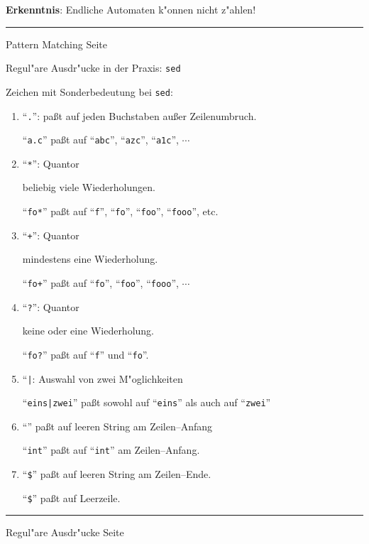 \begin{slide}{}
\textbf{Erkenntnis}: Endliche Automaten k"onnen nicht z"ahlen!



\vspace*{\fill}
\tiny \addtocounter{mypage}{1}
\rule{17cm}{1mm}
Pattern Matching \hspace*{\fill} Seite 
\end{slide}


\begin{slide}{}
\normalsize
\begin{center}
Regul"are Ausdr"ucke in der Praxis: \texttt{sed}
\end{center}

\footnotesize
Zeichen mit Sonderbedeutung bei \texttt{sed}:
\begin{enumerate}
\item ``\texttt{.}'': pa{\ss}t auf jeden Buchstaben au{\ss}er Zeilenumbruch.


      ``\texttt{a.c}'' pa{\ss}t auf 
      ``\texttt{abc}'', ``\texttt{azc}'', ``\texttt{a1c}'', $\cdots$
\item ``\texttt{*}'': Quantor

      beliebig viele Wiederholungen. 
      
      ``\texttt{fo*}'' pa{\ss}t auf 
      ``\texttt{f}'', 
      ``\texttt{fo}'', 
      ``\texttt{foo}'', 
      ``\texttt{fooo}'', etc.
\item ``\texttt{+}'': Quantor

      mindestens eine Wiederholung. 

      ``\texttt{fo+}'' pa{\ss}t auf 
      ``\texttt{fo}'', 
      ``\texttt{foo}'', 
      ``\texttt{fooo}'', $\cdots$
\item ``\texttt{?}'': Quantor

      keine oder eine Wiederholung. 

      ``\texttt{fo?}'' pa{\ss}t auf ``\texttt{f}'' und ``\texttt{fo}''.
\item ``\texttt{|}: Auswahl von zwei M"oglichkeiten


     ``\texttt{eins|zwei}'' pa{\ss}t sowohl auf ``\texttt{eins}'' als auch auf
     ``\texttt{zwei}''
\item ``\texttt{}'' pa{\ss}t auf leeren String am Zeilen--Anfang

     ``\texttt{int}'' pa{\ss}t auf ``\texttt{int}'' am Zeilen--Anfang.
\item ``\texttt{\$}'' %
     pa{\ss}t auf leeren String am Zeilen--Ende.

     ``\texttt{\$}'' %
     pa{\ss}t auf Leerzeile.
\end{enumerate}

\setcounter{page}{1}
\vspace*{\fill}
\tiny \addtocounter{mypage}{1}
\rule{17cm}{1mm}
Regul"are Ausdr"ucke  \hspace*{\fill} Seite 
\end{slide}

